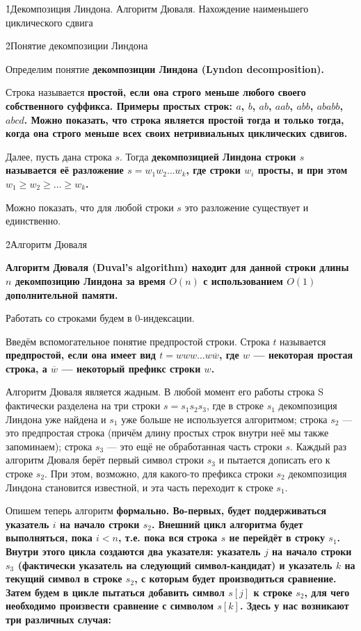 \h1{Декомпозиция Линдона. Алгоритм Дюваля. Нахождение наименьшего циклического сдвига}


\h2{Понятие декомпозиции Линдона}

Определим понятие \bf{декомпозиции Линдона} (Lyndon decomposition).

Строка называется \bf{простой}, если она строго \bf{меньше} любого своего собственного \bf{суффикса}. Примеры простых строк: $a$, $b$, $ab$, $aab$, $abb$, $ababb$, $abcd$. Можно показать, что строка является простой тогда и только тогда, когда она строго \bf{меньше} всех своих нетривиальных \bf{циклических сдвигов}.

Далее, пусть дана строка $s$. Тогда \bf{декомпозицией Линдона} строки $s$ называется её разложение $s = w_1 w_2 \ldots w_k$, где строки $w_i$ просты, и при этом $w_1 \ge w_2 \ge \ldots \ge w_k$.

Можно показать, что для любой строки $s$ это разложение существует и единственно.


\h2{Алгоритм Дюваля}

\bf{Алгоритм Дюваля} (Duval's algorithm) находит для данной строки длины $n$ декомпозицию Линдона за время $O (n)$ с использованием $O (1)$ дополнительной памяти.

Работать со строками будем в 0-индексации.

Введём вспомогательное понятие предпростой строки. Строка $t$ называется \bf{предпростой}, если она имеет вид $t = w w w \ldots w \overline{w}$, где $w$ --- некоторая простая строка, а $\overline{w}$ --- некоторый префикс строки $w$.

Алгоритм Дюваля является жадным. В любой момент его работы строка S фактически разделена на три строки $s = s_1 s_2 s_3$, где в строке $s_1$ декомпозиция Линдона уже найдена и $s_1$ уже больше не используется алгоритмом; строка $s_2$ --- это предпростая строка (причём длину простых строк внутри неё мы также запоминаем); строка $s_3$ --- это ещё не обработанная часть строки $s$. Каждый раз алгоритм Дюваля берёт первый символ строки $s_3$ и пытается дописать его к строке $s_2$. При этом, возможно, для какого-то префикса строки $s_2$ декомпозиция Линдона становится известной, и эта часть переходит к строке $s_1$.

Опишем теперь алгоритм \bf{формально}. Во-первых, будет поддерживаться указатель $i$ на начало строки $s_2$. Внешний цикл алгоритма будет выполняться, пока $i < n$, т.е. пока вся строка $s$ не перейдёт в строку $s_1$. Внутри этого цикла создаются два указателя: указатель $j$ на начало строки $s_3$ (фактически указатель на следующий символ-кандидат) и указатель $k$ на текущий символ в строке $s_2$, с которым будет производиться сравнение. Затем будем в цикле пытаться добавить символ $s[j]$ к строке $s_2$, для чего необходимо произвести сравнение с символом $s[k]$. Здесь у нас возникают три различных случая:

